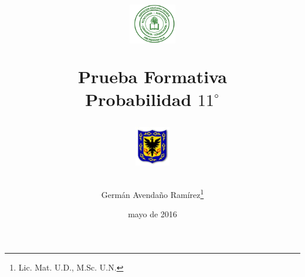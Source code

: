\documentclass[10pt,addpoints]{exam}
\begin{document}
\title{\begin{minipage}{.2\textwidth}
        \includegraphics[height=1.75cm]{Images/logo-colegio.png}
       \end{minipage}
\begin{minipage}{.55\textwidth}
 \begin{center}
Prueba Formativa\\Probabilidad $11^{\circ}$
\end{center}
\end{minipage}
\begin{minipage}{.2\textwidth}
\includegraphics[height=1.75cm]{Images/logo-sed.png} 
\end{minipage}
}
\author{Germ\'{a}n Avendaño Ram\'{i}rez\thanks{Lic. Mat. U.D., M.Sc. U.N.}}
\date{mayo de 2016}
\maketitle
\begin{center}
\end{center}
\end{document}
